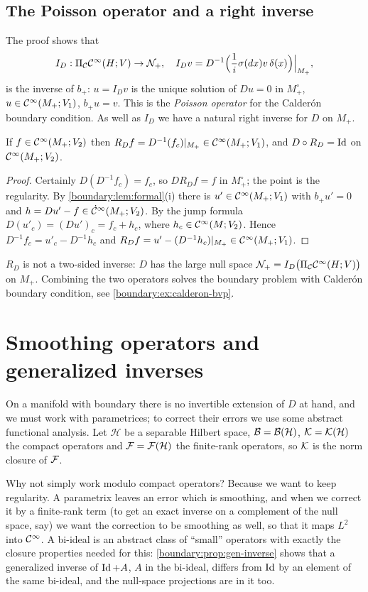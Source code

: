 \subsection*{The Poisson operator and a right inverse}
The proof shows that
\begin{equation*}
I_D:\Pi_{\mathcal{C}}\mathcal{C}^\infty(H;V)\to\mathcal{N}_+,\quad I_Dv=D^{-1}\Big(\frac1i\sigma(dx)v\,\delta(x)
\Big)\Big|_{M_+},
\end{equation*}
is the inverse of $b_+$: $u=I_Dv$ is the unique solution of $Du=0$ in $M_+^\circ$,
$u\in\mathcal{C}^\infty(M_+;V_1)$, $b_+u=v$. This is the \emph{Poisson operator} for the Calder\'on
boundary condition. As well as $I_D$ we have a natural right inverse for $D$ on $M_+$.

\begin{lemma}\label{boundary:lem:RD}
If $f\in\mathcal{C}^\infty(M_+;V_2)$ then $R_Df=D^{-1}(f_c)|_{M_+}\in\mathcal{C}^\infty(M_+;V_1)$, and $D\circ
R_D=\operatorname{Id}$ on $\mathcal{C}^\infty(M_+;V_2)$.
\end{lemma}
\begin{proof}
Certainly $D(D^{-1}f_c)=f_c$, so $DR_Df=f$ in $M_+^\circ$; the point is the
regularity. By \cref{boundary:lem:formal}(i) there is $u'\in\mathcal{C}^\infty(M_+;V_1)$ with
$b_+u'=0$ and $h=Du'-f\in\dot{\mathcal{C}}^\infty(M_+;V_2)$. By the jump formula $D(u'_c)=(Du')_c=f_c+h_c$,
where $h_c\in\mathcal{C}^\infty(M;V_2)$. Hence $D^{-1}f_c=u'_c-D^{-1}h_c$ and $R_Df=u'-(D^{-1}h_c)
|_{M_+}\in\mathcal{C}^\infty(M_+;V_1)$.
\end{proof}

$R_D$ is not a two-sided inverse: $D$ has the large null space $\mathcal{N}_+=I_D\big(
\Pi_{\mathcal{C}}\mathcal{C}^\infty(H;V)\big)$ on $M_+$. Combining the two operators solves the boundary problem
with Calder\'on boundary condition, see \cref{boundary:ex:calderon-bvp}.

\section{Smoothing operators and generalized inverses}\label{boundary:sec:smoothing}

On a manifold with boundary there is no invertible extension of $D$ at hand, and we
must work with parametrices; to correct their errors we use some abstract functional
analysis. Let $\mathcal H$ be a separable Hilbert space, $\mathcal{B}=\mathcal{B}(\mathcal H)$,
$\mathcal{K}=\mathcal{K}(\mathcal H)$ the compact operators and $\mathcal{F}=\mathcal{F}(\mathcal H)$ the
finite-rank operators, so $\mathcal{K}$ is the norm closure of $\mathcal{F}$.

\begin{discussion}
Why not simply work modulo compact operators? Because we want to keep
regularity. A parametrix leaves an error which is smoothing, and when we correct
it by a finite-rank term (to get an exact inverse on a complement of the null space,
say) we want the correction to be smoothing as well, so that it maps $L^2$ into
$\mathcal{C}^\infty$. A bi-ideal is an abstract class of ``small'' operators with exactly the
closure properties needed for this: \cref{boundary:prop:gen-inverse} shows that a
generalized inverse of $\operatorname{Id}+A$, $A$ in the bi-ideal, differs from $\operatorname{Id}$ by an element
of the same bi-ideal, and the null-space projections are in it too.
\end{discussion}

